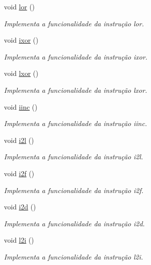 \begin{DoxyCompactItemize}
void \hyperlink{classOperations_a89193dfaaa2c4c45f320c6b9f0b5601c}{lor} ()
\begin{DoxyCompactList}\small\item\em Implementa a funcionalidade da instrução lor. \end{DoxyCompactList}\item 
void \hyperlink{classOperations_abd0ce3453623b677de3af1f05bcf4b0b}{ixor} ()
\begin{DoxyCompactList}\small\item\em Implementa a funcionalidade da instrução ixor. \end{DoxyCompactList}\item 
void \hyperlink{classOperations_ac135e723f1ac6a27c736e6b8e7d06a45}{lxor} ()
\begin{DoxyCompactList}\small\item\em Implementa a funcionalidade da instrução lxor. \end{DoxyCompactList}\item 
void \hyperlink{classOperations_a9934f9369192b10a978c7d6950592c42}{iinc} ()
\begin{DoxyCompactList}\small\item\em Implementa a funcionalidade da instrução iinc. \end{DoxyCompactList}\item 
void \hyperlink{classOperations_ae5d28665a74411cbb880e3007c5405e8}{i2l} ()
\begin{DoxyCompactList}\small\item\em Implementa a funcionalidade da instrução i2l. \end{DoxyCompactList}\item 
void \hyperlink{classOperations_a4880878630a620c325840fc7980dc131}{i2f} ()
\begin{DoxyCompactList}\small\item\em Implementa a funcionalidade da instrução i2f. \end{DoxyCompactList}\item 
void \hyperlink{classOperations_aee9ee24acc934bcf51340dc54d6ed231}{i2d} ()
\begin{DoxyCompactList}\small\item\em Implementa a funcionalidade da instrução i2d. \end{DoxyCompactList}\item 
void \hyperlink{classOperations_ad5820d99e67f4856e110685b775c5e9b}{l2i} ()
\begin{DoxyCompactList}\small\item\em Implementa a funcionalidade da instrução l2i. \end{DoxyCompactList}\item 

\end{DoxyCompactItemize}
